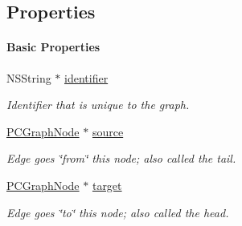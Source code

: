 \subsection*{Properties}
\begin{Indent}\paragraph*{Basic Properties}
\begin{DoxyCompactItemize}
\item 
\hypertarget{interface_p_c_graph_edge_a05f794363d0bfbfcc0fcf9e99b60717c}{
NSString $\ast$ \hyperlink{interface_p_c_graph_edge_a05f794363d0bfbfcc0fcf9e99b60717c}{identifier}}
\label{interface_p_c_graph_edge_a05f794363d0bfbfcc0fcf9e99b60717c}

\begin{DoxyCompactList}\small\item\em Identifier that is unique to the graph. \end{DoxyCompactList}\item 
\hypertarget{interface_p_c_graph_edge_a676ea0ceffbf93db7f4828ce1102e2eb}{
\hyperlink{interface_p_c_graph_node}{PCGraphNode} $\ast$ \hyperlink{interface_p_c_graph_edge_a676ea0ceffbf93db7f4828ce1102e2eb}{source}}
\label{interface_p_c_graph_edge_a676ea0ceffbf93db7f4828ce1102e2eb}

\begin{DoxyCompactList}\small\item\em Edge goes \char`\"{}from\char`\"{} this node; also called the tail. \end{DoxyCompactList}\item 
\hypertarget{interface_p_c_graph_edge_a5e13b913c5a6d1fea62eac2d099af6fb}{
\hyperlink{interface_p_c_graph_node}{PCGraphNode} $\ast$ \hyperlink{interface_p_c_graph_edge_a5e13b913c5a6d1fea62eac2d099af6fb}{target}}
\label{interface_p_c_graph_edge_a5e13b913c5a6d1fea62eac2d099af6fb}

\begin{DoxyCompactList}\small\item\em Edge goes \char`\"{}to\char`\"{} this node; also called the head. \end{DoxyCompactList}\end{DoxyCompactItemize}
\end{Indent}
